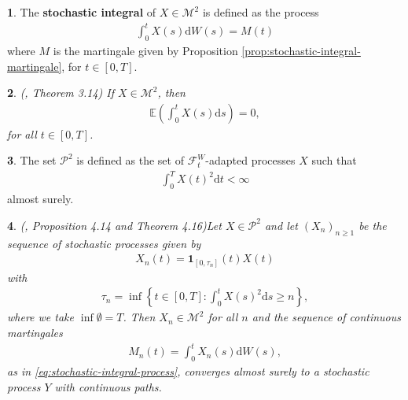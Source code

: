 \documentclass[english]{article}
\numberwithin{equation}{section}
\numberwithin{figure}{section}
\theoremstyle{bolddescit}
\newtheorem{theorem}{\protect\theoremname}[section]
\theoremstyle{definition}
\newtheorem{definition}[theorem]{\protect\definitionname}
\theoremstyle{definition}
\theoremstyle{plain}
\theoremstyle{plain}
\theoremstyle{bolddesc}
\theoremstyle{plain}
\newtheorem{proposition}[theorem]{\protect\propositionname}
\theoremstyle{remark}
\providecommand{\definitionname}{Definition}
\providecommand{\propositionname}{Proposition}
\providecommand{\theoremname}{Theorem}
\begin{document}
\begin{definition}\label{def:stochastic-integral-as-process}
  The \textbf{stochastic integral} of $X \in \mathcal{M}^2$ is defined as the process
  \begin{align}\label{eq:stochastic-integral-process}
    \int_0^t X(s) \mathrm{d}W(s) = M(t)
  \end{align}
  where $M$ is the martingale given by Proposition \ref{prop:stochastic-integral-martingale}, for $t \in [0,T]$.
\end{definition}

\begin{theorem}\label{thm:stochastic-integral-expectation-m2}
  (\cite{capinski_stochastic_2012}, Theorem 3.14)
  If $X \in \mathcal{M}^2$, then
  \begin{align*}
    \mathbb{E}\left(\int_0^t X(s) \mathrm{d}s\right) = 0,
  \end{align*}
  for all $t \in [0,T]$.
\end{theorem}

\begin{definition}
  The set $\mathcal{P}^2$ is defined as the set of $\mathcal{F}^W_t$-adapted processes $X$ such that
  \begin{align*}
    \int_0^T X(t)^2 \mathrm{d}t < \infty
  \end{align*}
  almost surely.
\end{definition}

\begin{proposition}(\cite{capinski_stochastic_2012}, Proposition 4.14 and Theorem 4.16)\label{prop:p2-localising-sequence}
  Let $X \in \mathcal{P}^2$ and let $(X_n)_{n \ge 1}$ be the sequence of stochastic processes given by
  \begin{align*}
    X_n(t) = \mathbf{1}_{[0,\tau_n]}(t) X(t)
  \end{align*}
  with
  \begin{align*}
    \tau_n = \inf \left\{ t \in [0,T] : \int_0^t X(s)^2 \mathrm{d}s \ge n \right\},
  \end{align*}
  where we take $\inf \emptyset = T$.
  Then $X_n \in \mathcal{M}^2$ for all $n$ and the sequence of continuous martingales
  \begin{align*}
    M_n(t) = \int_0^t X_n(s) \mathrm{d}W(s),
  \end{align*}
  as in \eqref{eq:stochastic-integral-process}, converges almost surely to a stochastic process $Y$ with continuous paths.
\end{proposition}
\end{document}
